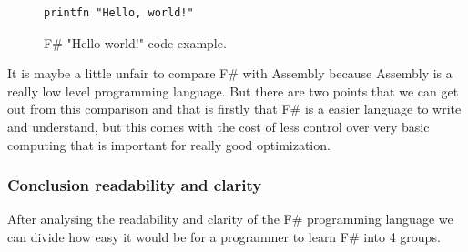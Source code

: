 \documentclass[12pt, a4paper]{article}
\newcommand*\quotefont{\fontfamily{LinuxLibertineT-LF}} %
\newcommand*\quotesize{60} %
\newcommand*{\openquote}
   {\tikz[remember picture,overlay,xshift=-4ex,yshift=-2.5ex]
   \node (OQ) {\quotefont\fontsize{\quotesize}{\quotesize}\selectfont``};\kern0pt}
\newcommand*{\closequote}[1]
  {\tikz[remember picture,overlay,xshift=4ex,yshift={#1}]
   \node (CQ) {\quotefont\fontsize{\quotesize}{\quotesize}\selectfont''};}
\newcommand*\shadedauthorformat{\emph} %
\newcommand*\authoralign[1]{
 	\def\authorfill{\hfill}\def\quotefill{}
}
\newenvironment{shadequote}[2][l]%
{\authoralign{#1}
\ifblank{#2}
   {\def\shadequoteauthor{}\def\yshift{-2ex}\def\quotefill{\hfill}}
   {\def\shadequoteauthor{\par\authorfill\shadedauthorformat{#2}}\def\yshift{2ex}}
\begin{snugshade}\begin{quote}\openquote}
{\shadequoteauthor\quotefill\closequote{\yshift}\end{quote}\end{snugshade}}
\begin{document}
\begin{figure}[!h]
	\begin{lstlisting}
printfn "Hello, world!"
	\end{lstlisting}
	\caption{F\# "Hello world!" code example.}
	\label{fig:fSharpHelloWorld}
\end{figure}

It is maybe a little unfair to compare F\# with Assembly because Assembly is a really low level programming language. But there are two points that we can get out from this comparison and that is firstly that F\# is a easier language to write and understand, but this comes with the cost of less control over very basic computing that is important for really good optimization.

\newpage






\subsubsection{Conclusion readability and clarity}

After analysing the readability and clarity of the F\# programming language we can divide how easy it would be for a programmer to learn F\# into 4 groups.
\end{document}
